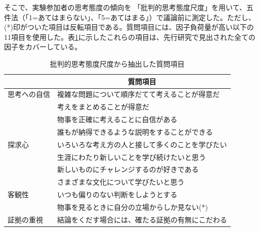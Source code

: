 \documentclass[11pt, a4paper]{jreport} %
\begin{document}
そこで、実験参加者の思考態度の傾向を
「批判的思考態度尺度\cite{110001889133}」を用いて、五件法（「1=あてはまらない」、「5=あてはまる」）で議論前に測定した。ただし、(*)印がついた項目は反転項目である。質問項目には、因子負荷量が高い以下の11項目を使用した。表\ref{tab:hihanteki3}に示したこれらの項目は、先行研究で見出された全ての因子をカバーしている。


\begin{table}[H]
\caption{批判的思考態度尺度\cite{110001889133}から抽出した質問項目}
\centering
\label{tab:hihanteki3}
\begin{tabular}{@{}ll@{}}
\toprule
\multicolumn{1}{c}{} & \multicolumn{1}{c}{質問項目} \\ \midrule
思考への自信               & 複雑な問題について順序だてて考えることが得意だ  \\
                     & 考えをまとめることが得意だ            \\
                     & 物事を正確に考えることに自信がある        \\
                     & 誰もが納得できるような説明をすることができる   \\
探求心                  & いろいろな考え方の人と接して多くのことを学びたい \\
                     & 生涯にわたり新しいことを学び続けたいと思う    \\
                     & 新しいものにチャレンジするのが好きである     \\
                     & さまざまな文化について学びたいと思う       \\
客観性                  & いつも偏りのない判断をしようとする        \\
                     & 物事を見るときに自分の立場からしか見ない(*)     \\
証拠の重視                & 結論をくだす場合には、確たる証拠の有無にこだわる \\ \bottomrule
\end{tabular}
\end{table}
\end{document}
